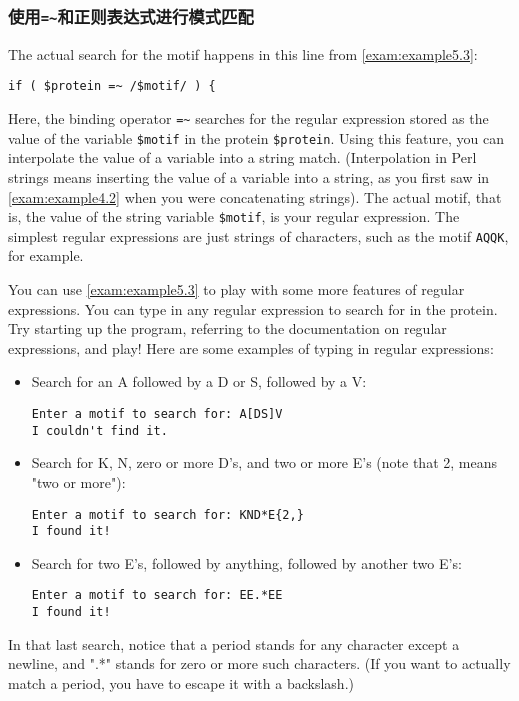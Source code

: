 \cprotect \subsubsection{使用\verb|=~|和正则表达式进行模式匹配}
The actual search for the motif happens in this line from \autoref{exam:example5.3}: 

\begin{lstlisting}
if ( $protein =~ /$motif/ ) {
\end{lstlisting}

Here, the binding operator \verb|=~| searches for the regular expression stored as the value of the variable \verb|$motif| in the protein \verb|$protein|. Using this feature, you can interpolate the value of a variable into a string match. (Interpolation in Perl strings means inserting the value of a variable into a string, as you first saw in \autoref{exam:example4.2} when you were concatenating strings). The actual motif, that is, the value of the string variable \verb|$motif|, is your regular expression. The simplest regular expressions are just strings of characters, such as the motif \verb|AQQK|, for example.

You can use \autoref{exam:example5.3} to play with some more features of regular expressions. You can type in any regular expression to search for in the protein. Try starting up the program, referring to the documentation on regular expressions, and play! Here are some examples of typing in regular expressions: 

\begin{itemize}
  \item Search for an A followed by a D or S, followed by a V: 
\begin{lstlisting}
Enter a motif to search for: A[DS]V
I couldn't find it.
\end{lstlisting}
  \item Search for K, N, zero or more D's, and two or more E's (note that {2,} means "two or more"): 
\begin{lstlisting}
Enter a motif to search for: KND*E{2,}
I found it!
\end{lstlisting}
  \item Search for two E's, followed by anything, followed by another two E's: 
\begin{lstlisting}
Enter a motif to search for: EE.*EE
I found it!
\end{lstlisting}
\end{itemize}

In that last search, notice that a period stands for any character except a newline, and ".*" stands for zero or more such characters. (If you want to actually match a period, you have to escape it with a backslash.) 


